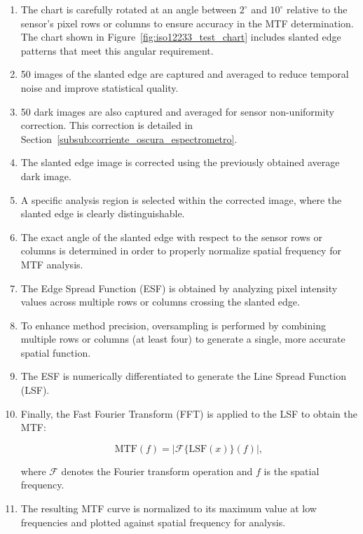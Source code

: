 \begin{enumerate}
    \item The chart is carefully rotated at an angle between $2^\circ$ and $10^\circ$ relative to the sensor’s pixel rows or columns to ensure accuracy in the MTF determination. The chart shown in Figure~\ref{fig:iso12233_test_chart} includes slanted edge patterns that meet this angular requirement.

    \item 50 images of the slanted edge are captured and averaged to reduce temporal noise and improve statistical quality.

    \item 50 dark images are also captured and averaged for sensor non-uniformity correction. This correction is detailed in Section~\ref{subsub:corriente_oscura_espectrometro}.

    \item The slanted edge image is corrected using the previously obtained average dark image.

    \item A specific analysis region is selected within the corrected image, where the slanted edge is clearly distinguishable.

    \item The exact angle of the slanted edge with respect to the sensor rows or columns is determined in order to properly normalize spatial frequency for MTF analysis.

    \item The Edge Spread Function (ESF) is obtained by analyzing pixel intensity values across multiple rows or columns crossing the slanted edge.

    \item To enhance method precision, oversampling is performed by combining multiple rows or columns (at least four) to generate a single, more accurate spatial function.

    \item The ESF is numerically differentiated to generate the Line Spread Function (LSF).

    \item Finally, the Fast Fourier Transform (FFT) is applied to the LSF to obtain the MTF:

    \begin{equation}
        \text{MTF}(f) = \left|\mathcal{F}\{\text{LSF}(x)\}(f)\right|,
    \end{equation}

    where $\mathcal{F}$ denotes the Fourier transform operation and $f$ is the spatial frequency.

    \item The resulting MTF curve is normalized to its maximum value at low frequencies and plotted against spatial frequency for analysis.
\end{enumerate}

